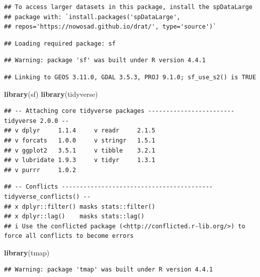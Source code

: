\documentclass[]{article}
\newenvironment{Shaded}{\begin{snugshade}}{\end{snugshade}}
\newcommand{\FunctionTok}[1]{\textcolor[rgb]{0.13,0.29,0.53}{\textbf{#1}}}
\newcommand{\NormalTok}[1]{#1}
\begin{document}
\begin{verbatim}
## To access larger datasets in this package, install the spDataLarge
## package with: `install.packages('spDataLarge',
## repos='https://nowosad.github.io/drat/', type='source')`
\end{verbatim}

\begin{verbatim}
## Loading required package: sf
\end{verbatim}

\begin{verbatim}
## Warning: package 'sf' was built under R version 4.4.1
\end{verbatim}

\begin{verbatim}
## Linking to GEOS 3.11.0, GDAL 3.5.3, PROJ 9.1.0; sf_use_s2() is TRUE
\end{verbatim}

\begin{Shaded}
\begin{Highlighting}[]
\FunctionTok{library}\NormalTok{(sf)}
\FunctionTok{library}\NormalTok{(tidyverse)}
\end{Highlighting}
\end{Shaded}

\begin{verbatim}
## -- Attaching core tidyverse packages ------------------------ tidyverse 2.0.0 --
## v dplyr     1.1.4     v readr     2.1.5
## v forcats   1.0.0     v stringr   1.5.1
## v ggplot2   3.5.1     v tibble    3.2.1
## v lubridate 1.9.3     v tidyr     1.3.1
## v purrr     1.0.2
\end{verbatim}

\begin{verbatim}
## -- Conflicts ------------------------------------------ tidyverse_conflicts() --
## x dplyr::filter() masks stats::filter()
## x dplyr::lag()    masks stats::lag()
## i Use the conflicted package (<http://conflicted.r-lib.org/>) to force all conflicts to become errors
\end{verbatim}

\begin{Shaded}
\begin{Highlighting}[]
\FunctionTok{library}\NormalTok{(tmap)}
\end{Highlighting}
\end{Shaded}

\begin{verbatim}
## Warning: package 'tmap' was built under R version 4.4.1
\end{verbatim}
\end{document}
